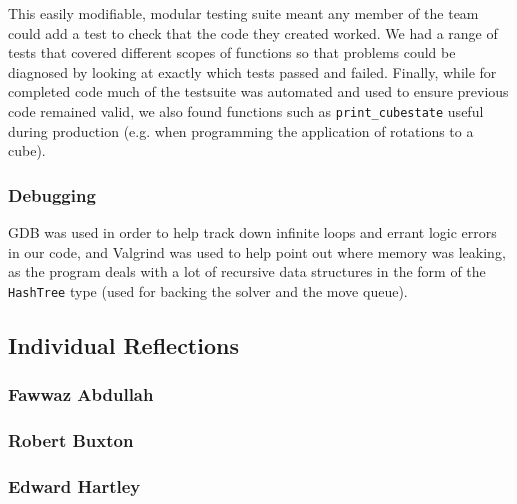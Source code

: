 \documentclass[8pt]{article}
\begin{document}
This easily modifiable, modular testing suite meant any member of the team could add a test to check that the code they created worked.
We had a range of tests that covered different scopes of functions so that problems could be diagnosed by looking at exactly which tests passed and failed.
Finally, while for completed code much of the testsuite was automated and used to ensure previous code remained valid, we also found functions such as 
\texttt{print\_cubestate} useful during production (e.g. when programming the application of rotations to a cube).

\subsubsection{Debugging}

GDB was used in order to help track down infinite loops and errant logic errors in our code, and Valgrind was used to help point out where memory was leaking, as the program deals with a lot of recursive data structures in the form of the \texttt{HashTree} type (used for backing the solver and the move queue).

\subsection{Individual Reflections}

\subsubsection{Fawwaz Abdullah}



\subsubsection{Robert Buxton}



\subsubsection{Edward Hartley}
\end{document}
